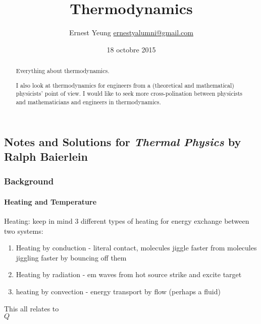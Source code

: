 \documentclass[10pt]{amsart}
\title{Thermodynamics}
\author{Ernest Yeung \href{mailto:ernestyalumni@gmail.com}{ernestyalumni@gmail.com}}
\date{18 octobre 2015}
\begin{document}

\maketitle

\tableofcontents

\begin{multicols*}{2}

\begin{abstract}
Everything about thermodynamics.  

I also look at thermodynamics for engineers from a (theoretical and mathematical) physicists' point of view.  I would like to seek more cross-polination between physicists and mathematicians and engineers in thermodynamics.
\end{abstract}

\part{Notes and Solutions for \emph{Thermal Physics} by Ralph Baierlein}\cite{RBaierlein1999}

\section{Background}

\subsection{Heating and Temperature}

Heating: keep in mind 3 different types of heating for energy exchange between two systems:

\begin{enumerate}
  \item Heating by conduction - literal contact, molecules jiggle faster from molecules jiggling faster by bouncing off them
  \item Heating by radiation - em waves from hot source strike and excite target
  \item heating by convection - energy transport by flow (perhaps a fluid)
\end{enumerate}

This all relates to \\
$Q$


\end{multicols*}
\end{document}
